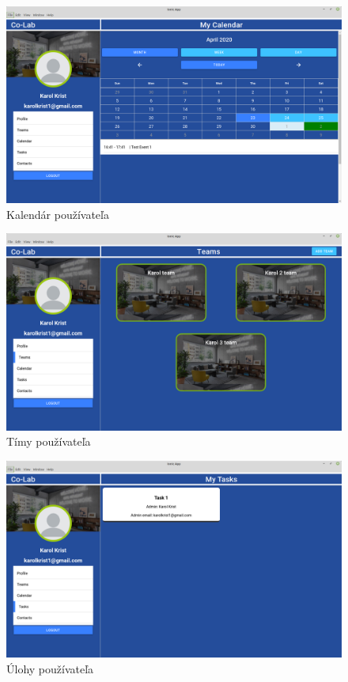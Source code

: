 \begin{figure}[H]
    \centering
    \includegraphics[scale=0.30]{img/design/mycal.png}
    \caption{Kalendár používateľa}
    \label{fig:mycal}
\end{figure}

\begin{figure}[H]
    \centering
    \includegraphics[scale=0.30]{img/design/teams.png}
    \caption{Tímy používateľa}
    \label{fig:teams_design}
\end{figure}

\begin{figure}[H]
    \centering
    \includegraphics[scale=0.30]{img/design/mytask.png}
    \caption{Úlohy používateľa}
    \label{fig:my_tasks}
\end{figure}

